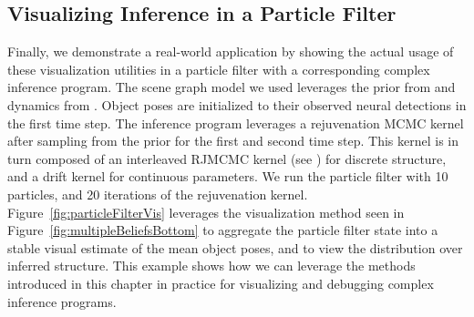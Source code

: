 \subsection{Visualizing Inference in a Particle Filter}
Finally, we demonstrate a real-world application by showing the actual usage of these visualization utilities in a particle filter with a corresponding complex inference program.
The scene graph model we used leverages the prior from  and dynamics from .
Object poses are initialized to their observed neural detections in the first time step.
The inference program leverages a rejuvenation MCMC kernel after sampling from the prior for the first and second time step.
This kernel is in turn composed of an interleaved RJMCMC kernel (see ) for discrete structure, and a drift kernel for continuous parameters.
We run the particle filter with 10 particles, and 20 iterations of the rejuvenation kernel.
Figure~\ref{fig:particleFilterVis} leverages the visualization method seen in Figure~\ref{fig:multipleBeliefsBottom} to aggregate the particle filter state into a stable visual estimate of the mean object poses, and to view the distribution over inferred structure.
This example shows how we can leverage the methods introduced in this chapter in practice for visualizing and debugging complex inference programs.
